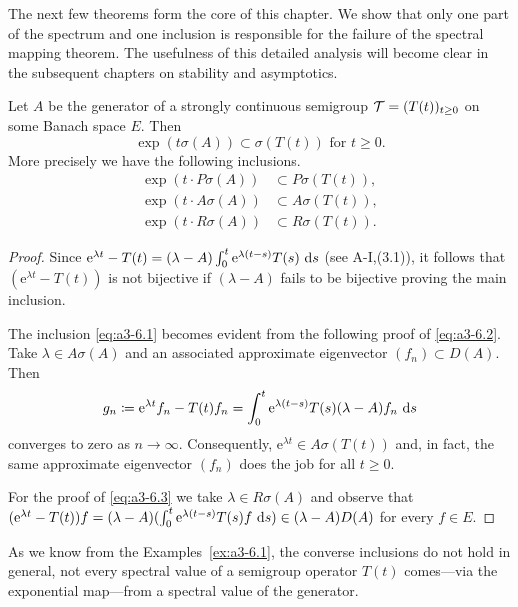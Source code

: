 The next few theorems form the core of this chapter. 
We show that only one part of the spectrum and one inclusion is responsible for the failure of the spectral mapping theorem.
The usefulness of this detailed analysis will become clear in the subsequent chapters on stability and asymptotics.
\begin{proposition}
\label{prop:a3-6.2}%
	
Let $A$ be the generator of a strongly continuous semigroup $\mathcal{T} = (T(t))_{t \geq 0}$ on some Banach space $E$.
Then
\[
\exp(t\sigma(A)) \subset \sigma(T(t)) \text{ for } t \geq 0 .
\]
More precisely we have the following inclusions.
\begin{align}
\exp(t \cdot P\sigma(A)) &\subset P\sigma(T(t)) \label{eq:a3-6.1} , \\
\exp(t \cdot A\sigma(A)) &\subset A\sigma(T(t)) \label{eq:a3-6.2} , \\
\exp(t \cdot R\sigma(A)) &\subset R\sigma(T(t)) \label{eq:a3-6.3} .
\end{align}
\end{proposition}
\begin{proof}
Since $\mathrm{e}^{\lambda t} - T(t) = (\lambda - A)\int_{0}^{t} \mathrm{e}^{\lambda(t-s)}T(s) \, \mathop{}\!\mathrm{d}{s}$ (see A-I,(3.1)), it follows that $(\mathrm{e}^{\lambda t} - T(t))$ is not bijective if $(\lambda - A)$ fails to be bijective proving the main inclusion.

The inclusion \eqref{eq:a3-6.1} becomes evident from the following proof of \eqref{eq:a3-6.2}. Take $\lambda \in A\sigma(A)$ and an associated approximate eigenvector $(f_{n}) \subset D(A)$.
Then
\[
g_{n} \coloneqq \mathrm{e}^{\lambda t}f_{n} - T(t)f_{n} = \int_{0}^{t} \mathrm{e}^{\lambda(t-s)}T(s)(\lambda-A)f_{n} \, \mathop{}\!\mathrm{d}{s}
\]
converges to zero as $n \to \infty$.
Consequently, $\mathrm{e}^{\lambda t} \in A\sigma(T(t))$ and, in fact, the same approximate eigenvector $(f_{n})$ does the job for all $t \geq 0$.

For the proof of \eqref{eq:a3-6.3} we take $\lambda \in R\sigma(A)$ and observe that $(\mathrm{e}^{\lambda t} - T(t))f = (\lambda - A)(\int_{0}^{t} \mathrm{e}^{\lambda(t-s)}T(s)f \, \mathop{}\!\mathrm{d}{s}) \in (\lambda - A)D(A)$ for every $f \in E$.
\end{proof}
As we know from the Examples~\ref{ex:a3-6.1}, the converse inclusions do not hold in general, \ie not every spectral value of a semigroup operator $T(t)$ comes---via the exponential map---from a spectral value of the generator.
